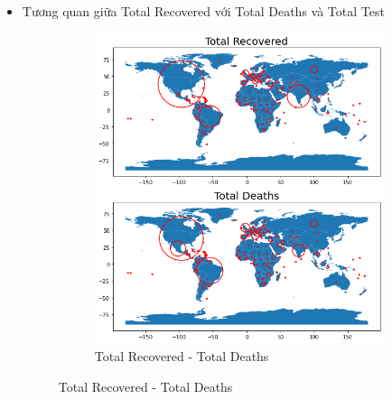 \documentclass[a4paper, 12pt]{article}
\begin{document}
\begin{itemize}
\begin{itemize}
            \item Tương quan giữa Total Recovered với Total Deaths và Total Test
            \begin{figure}[H]
                \begin{subfigure}{.5\textwidth}
                    \centering
                    \includegraphics[width=1\linewidth]{img/recovered_death.png}  
                    \caption{Total Recovered - Total Deaths}
    

\end{subfigure}
\end{figure}
\end{itemize}
\end{itemize}
\end{document}
